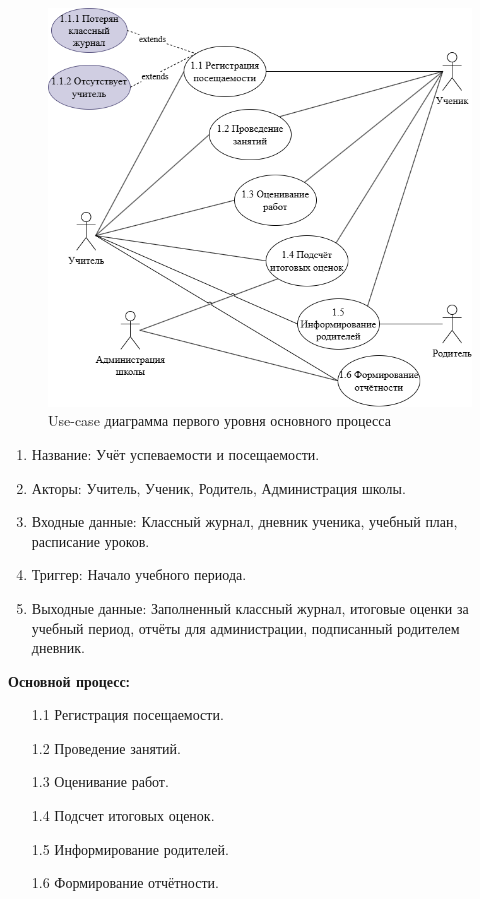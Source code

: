 \documentclass[a4paper, final]{article}
\begin{document}
\begin{figure}[H]
  \centering
  \includegraphics[width=0.9\linewidth]{use_case1.png}
  \caption{Use-case диаграмма первого уровня основного процесса}
  \label{img:use_case1}
\end{figure}

\begin{enumerate}
  \item Название: Учёт успеваемости и посещаемости.
  \item Акторы: Учитель, Ученик, Родитель, Администрация школы.
  \item Входные данные: Классный журнал, дневник ученика, учебный план, расписание уроков.
  \item Триггер: Начало учебного периода.
  \item Выходные данные: Заполненный классный журнал, итоговые оценки за учебный период, отчёты для администрации, подписанный родителем дневник.
\end{enumerate}

\textbf{Основной процесс:}
\begin{enumerate}
  \item[1.1] Регистрация посещаемости.
  \item[1.2] Проведение занятий.
  \item[1.3] Оценивание работ.
  \item[1.4] Подсчет итоговых оценок.
  \item[1.5] Информирование родителей.
  \item[1.6] Формирование отчётности.
\end{enumerate}
\end{document}
